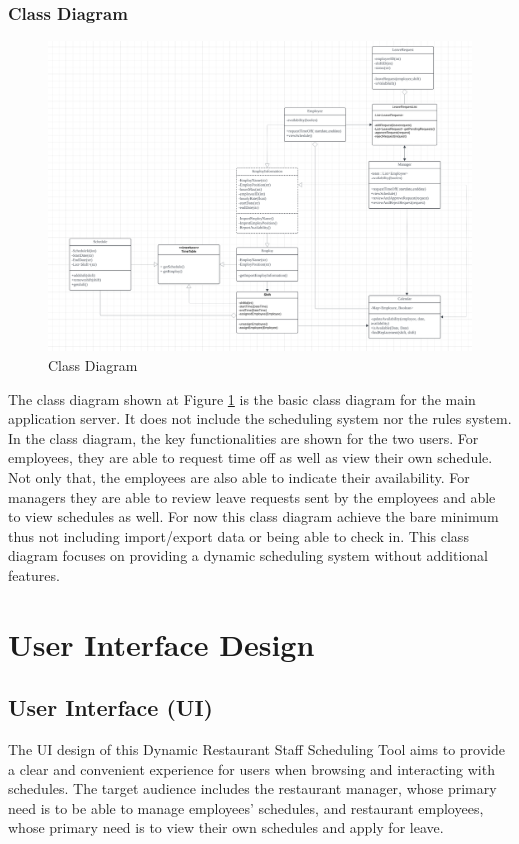 \documentclass[a4paper,12pt, oneside]{report}
\begin{document}
\subsection{Class Diagram}
\begin{figure}[H]
    \centering
    \includegraphics[width=\linewidth]{UMLDiagrams/ClassDiagram.png}
    \caption{Class Diagram}
    \label{fig:class-diagram}
\end{figure}
The class diagram shown at Figure \ref{fig:class-diagram} is the basic class diagram for the main application server. It does not include the scheduling system nor the rules system. In the class diagram, the key functionalities are shown for the two users. For employees, they are able to request time off as well as view their own schedule. Not only that, the employees are also able to indicate their availability. For managers they are able to review leave requests sent by the employees and able to view schedules as well. For now this class diagram achieve the bare minimum thus not including import/export data or being able to check in. This class diagram focuses on providing a dynamic scheduling system without additional features.


\chapter{User Interface Design}

\section{User Interface (UI)}
The UI design of this Dynamic Restaurant Staff Scheduling Tool aims to provide a clear and convenient experience for users when browsing and interacting with schedules. The target audience includes the restaurant manager, whose primary need is to be able to manage employees’ schedules, and restaurant employees, whose primary need is to view their own schedules and apply for leave.\\
\end{document}
